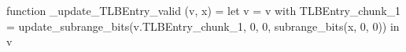 function _update_TLBEntry_valid (v, x) = let v = { v with TLBEntry_chunk_1 = update_subrange_bits(v.TLBEntry_chunk_1, 0, 0, subrange_bits(x, 0, 0)) } in
  v
